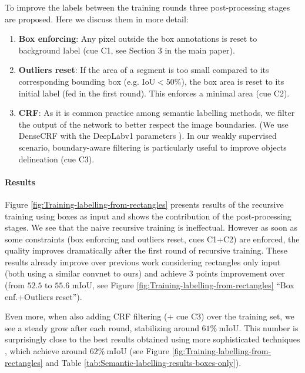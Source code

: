 \documentclass[10pt,english,british,twocolumn]{article}
\begin{document}
To improve the labels between the training rounds three post-processing
stages are proposed. Here we discuss them in more detail:
\begin{enumerate}
\item \textbf{Box enforcing}: Any pixel outside the box annotations is reset
to background label (cue C1, see Section 3 in the main paper).
\item \textbf{Outliers reset}: If the area of a segment is too small compared
to its corresponding bounding box (e.g. IoU$<50\%$), the box area
is reset to its initial label (fed in the first round). This enforces
a minimal area (cue C2).
\item \textbf{CRF}: As it is common practice among semantic labelling methods,
we filter the output of the network to better respect the image boundaries.
(We use DenseCRF \cite{Kraehenbuehl2011Nips} with the Deep\-Lab\-v1
parameters \cite{Chen2015Iclr}). In our weakly supervised scenario,
boundary-aware filtering is particularly useful to improve objects
delineation (cue C3).
\end{enumerate}
\vspace{-1em}


\paragraph{Results}

Figure \ref{fig:Training-labelling-from-rectangles} presents results
of the recursive training using boxes as input and shows the contribution
of the post-processing stages. We see that the naive recursive training
is ineffectual. However as soon as some constraints (box enforcing
and outliers reset, cues C1+C2) are enforced, the quality improves
dramatically after the first round of recursive training. These results
already improve over previous work considering rectangles only input
\cite{Dai2015Iccv,Papandreou2015Iccv} (both using a similar convnet
to ours) and achieve $3$ points improvement over \cite{Papandreou2015Iccv}
(from $52.5$ to $55.6$ mIoU, see Figure \ref{fig:Training-labelling-from-rectangles}
``Box enf.+Outliers reset'').

Even more, when also adding CRF filtering (+ cue C3) over the training
set, we see a steady grow after each round, stabilizing around $61\%\ \mbox{mIoU}$.
This number is surprisingly close to the best results obtained using
more sophisticated techniques \cite{Dai2015Iccv}, which achieve around
$62\%\ \mbox{mIoU}$ (see Figure \ref{fig:Training-labelling-from-rectangles}
and Table \ref{tab:Semantic-labelling-results-boxes-only}). 
\end{document}
